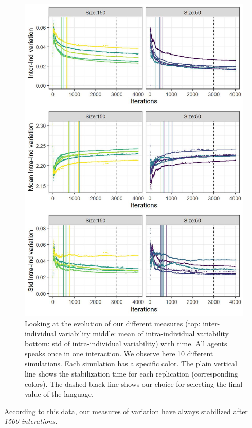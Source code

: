 \documentclass[
]{article}
\begin{document}
\begin{figure}[!H]

{\centering \includegraphics{./Figures/print timeline-1} 

}

\caption{Looking at the evolution of our different measures (top: inter-individual variability middle: mean of intra-individual variability bottom: std of intra-individual variability) with time. All agents speaks once in one interaction. We observe here 10 different simulations. Each simulation has a specific color. The plain vertical line shows the stabilization time for each replication (corresponding colors). The dashed black line shows our choice for selecting the final value of the language.}\label{fig:print timeline}
\end{figure}

According to this data, our measures of variation have always stabilized
after \emph{1500 interations.}
\end{document}
